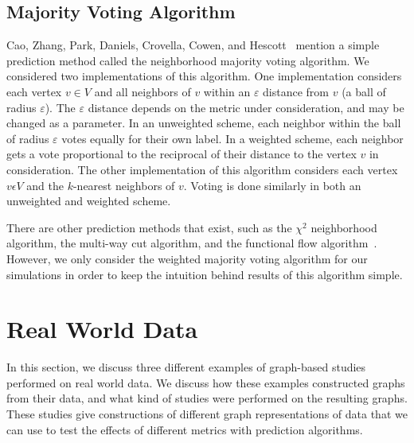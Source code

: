 \subsection{Majority Voting Algorithm}
Cao, Zhang, Park, Daniels, Crovella, Cowen, and Hescott~\cite{10.1371/journal.pone.0076339}
mention a simple prediction method called the neighborhood majority voting
algorithm. We considered two implementations of this algorithm. One 
implementation considers each vertex $v \in V$ and all neighbors of $v$ within an $\varepsilon$
distance from $v$ (a ball of radius $\varepsilon$). The $\varepsilon$ distance depends on the metric
under consideration, and may be changed as a parameter. In an unweighted scheme, each neighbor
within the ball of radius $\varepsilon$ votes equally for their own label. In a weighted scheme,
each neighbor gets a vote proportional to the reciprocal of their distance to the vertex $v$ in
consideration. The other implementation of this algorithm considers each vertex $v \epsilon V$ and
the $k$-nearest neighbors of $v$. Voting is done similarly in both an unweighted and weighted
scheme.

There are other prediction methods that exist, such as the $\chi^{2}$ neighborhood algorithm, the
multi-way cut algorithm, and the functional flow algorithm~\cite{10.1371/journal.pone.0076339}.
However, we only consider the weighted majority voting algorithm for our simulations in order to
keep the intuition behind results of this algorithm simple.

\section{Real World Data}

In this section, we discuss three different examples of graph-based studies performed on real world
data. We discuss how these examples constructed graphs from their data, and what kind of studies
were performed on the resulting graphs. These studies give constructions of different graph
representations of data that we can use to test the effects of different metrics with prediction
algorithms.

